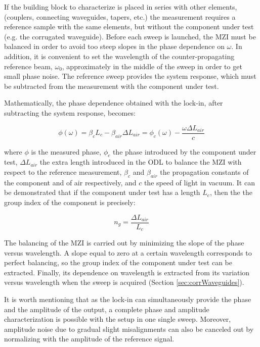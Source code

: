 \documentclass[journal]{IEEEtran}
\begin{document}
If the building block to characterize is placed in series with other elements, (couplers, connecting waveguides, tapers, etc.) the measurement requires a reference sample with the same elements, but without the component under test (e.g. the corrugated waveguide).
Before each sweep is launched, the MZI must be balanced in order to avoid too steep slopes in the phase dependence on $\omega$.
In addition, it is convenient to set the wavelength of the counter-propagating reference beam, $\omega_0$, approximately in the middle of the sweep in order to get small phase noise.
The reference sweep provides the system response, which must be subtracted from the measurement with the component under test. 


Mathematically, the phase dependence obtained with the lock-in, after subtracting the system response, becomes:


\begin{equation}
  \phi(\omega)= \beta_c L_c - \beta_{air} \Delta L_{air} =\phi_{c}(\omega)-\frac{\omega\Delta L_{air}}{c}
  \label{eq:response}
\end{equation}

where $\phi$ is the measured phase, $\phi_{c}$ the phase introduced by the component under test, $\Delta L_{air}$ the extra length introduced in the ODL to balance the MZI with respect to the reference measurement, $\beta_c$ and $\beta_{air}$ the propagation constants of the component and of air respectively, and $c$ the speed of light in vacuum. It can be demonstrated \cite{Mas2012} that if the component under test has a length $L_{c}$, then the the group index of the component is precisely:

\begin{equation}
  n_{g} = \frac{\Delta L_{air}}{L_{c}}
  \label{eq:group_index_pathBalancing}
\end{equation}

The balancing of the MZI is carried out by minimizing the slope of the phase versus wavelength. A slope equal to zero at a certain wavelength corresponds to perfect balancing, so the group index of the component under test can be extracted. Finally, its dependence on wavelength is extracted from its variation versus wavelength when the sweep is acquired (Section \ref{sec:corrWaveguides}).

It is worth mentioning that as the lock-in can simultaneously provide the phase and the amplitude of the output, a complete phase and amplitude characterization is possible with the setup in one single sweep. Moreover, amplitude noise due to gradual slight misalignments can also be canceled out by normalizing with the amplitude of the reference signal.
\end{document}
